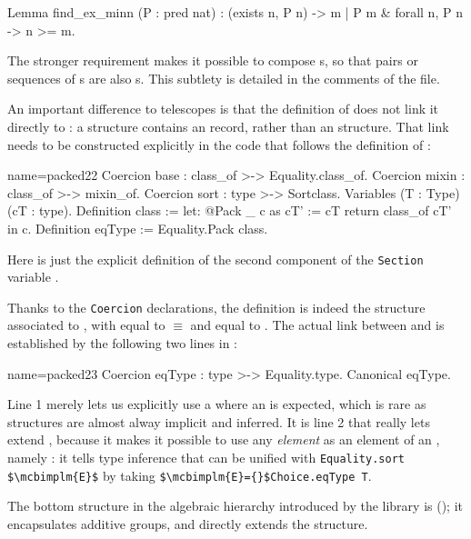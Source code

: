 \begin{coq}{}{}
Lemma find_ex_minn (P : pred nat)  :
  (exists n, P n) -> {m | P m & forall n, P n -> n >= m}.
\end{coq}
The stronger requirement
makes it possible to compose s, so that pairs or
sequences of s are also s.  This subtlety
is detailed in the comments of the  file.

An important difference to telescopes is that the definition of
 does not link it directly to : a
 structure contains an  record, rather
than an  structure. That link needs to be constructed
explicitly in the code that follows the definition of :

\begin{coq}{name=packed22}{}
Coercion base : class_of >-> Equality.class_of.
Coercion mixin : class_of >-> mixin_of.
Coercion sort : type >-> Sortclass.
Variables (T : Type) (cT : type).
Definition class := let: @Pack _ c as cT' := cT return class_of cT' in c.
Definition eqType := Equality.Pack class.
\end{coq}

Here  is just the explicit definition of the second component
of the \lstinline/Section/ variable .

Thanks to the \lstinline/Coercion/ declarations, the  definition is
indeed the  structure associated to , with 
equal to ${}\equiv{}$ and  equal to .
The actual link between  and  is established
by the following two lines in :

\begin{coq}{name=packed23}{}
Coercion eqType : type >-> Equality.type.
Canonical eqType.
\end{coq}

Line 1 merely lets us explicitly use a  where an
 is expected, which is rare as structures are almost alway
implicit and inferred.  It is line 2 that really lets 
extend , because it makes it possible to use any
\emph{element}  as an element of an ,
namely : it tells type inference that 
can be unified with \lstinline/Equality.sort $\mcbimplm{E}$/ by taking
\lstinline/$\mcbimplm{E}={}$Choice.eqType T/.

The bottom structure in the \mcbMC{} algebraic hierarchy introduced by
the  library is  (); it
encapsulates additive groups, and directly extends the 
structure.

